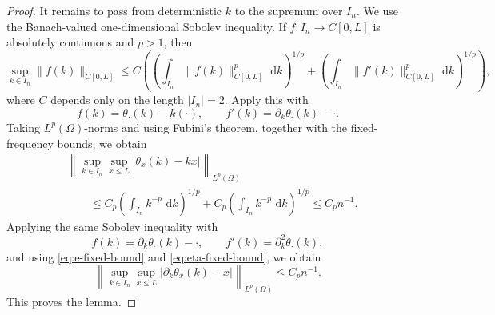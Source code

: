 \documentclass[10pt,a4paper]{amsart}
\newcommand{\dd}{\,\mathrm d}
\begin{document}
\begin{proof}
It remains to pass from deterministic $k$ to the supremum over $I_n$. We use the Banach-valued one-dimensional Sobolev inequality. If $f:I_n\to C[0,L]$ is absolutely continuous and $p>1$, then
\[
    \sup_{k\in I_n}\|f(k)\|_{C[0,L]}
    \le C
    \left(
      \left(\int_{I_n}\|f(k)\|_{C[0,L]}^p\,\dd k\right)^{1/p}
      +
      \left(\int_{I_n}\|f'(k)\|_{C[0,L]}^p\,\dd k\right)^{1/p}
    \right),
\]
where $C$ depends only on the length $|I_n|=2$. Apply this with
\[
    f(k)=\theta_\cdot(k)-k(\cdot),
    \qquad f'(k)=\partial_k\theta_\cdot(k)-\cdot.
\]
Taking $L^p(\Omega)$-norms and using Fubini's theorem, together with the fixed-frequency bounds, we obtain
\[
\begin{aligned}
&\left\|\sup_{k\in I_n}\sup_{x\le L}|\theta_x(k)-kx|\right\|_{L^p(\Omega)} \\
&\qquad \le C_p
    \left(\int_{I_n} k^{-p}\,\dd k\right)^{1/p}
    +C_p
    \left(\int_{I_n} k^{-p}\,\dd k\right)^{1/p}
    \le C_p n^{-1}.
\end{aligned}
\]
Applying the same Sobolev inequality with
\[
    f(k)=\partial_k\theta_\cdot(k)-\cdot,
    \qquad f'(k)=\partial_k^2\theta_\cdot(k),
\]
and using \eqref{eq:e-fixed-bound} and \eqref{eq:eta-fixed-bound}, we obtain
\[
    \left\|\sup_{k\in I_n}\sup_{x\le L}|\partial_k\theta_x(k)-x|\right\|_{L^p(\Omega)}
    \le C_p n^{-1}.
\]
This proves the lemma.
\end{proof}
\end{document}
